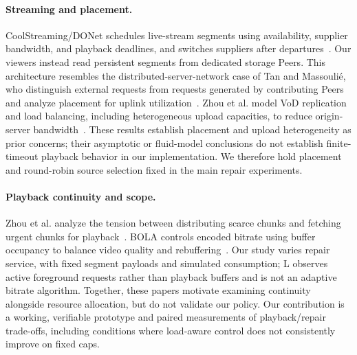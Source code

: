 \paragraph{Streaming and placement.}
CoolStreaming/DONet schedules live-stream segments using availability,
supplier bandwidth, and playback deadlines, and switches suppliers after
departures~\cite{zhang2005coolstreaming}. Our viewers instead read persistent
segments from dedicated storage Peers. This architecture resembles the
distributed-server-network case of Tan and Massouli\'{e}, who distinguish
external requests from requests generated by contributing Peers and analyze
placement for uplink utilization~\cite{tan2011placement}. Zhou et al. model
VoD replication and load balancing, including heterogeneous upload
capacities, to reduce origin-server bandwidth~\cite{zhou2011replication}.
These results establish placement and upload heterogeneity as prior concerns;
their asymptotic or fluid-model conclusions do not establish finite-timeout
playback behavior in our implementation. We therefore hold placement and
round-robin source selection fixed in the main repair experiments.

\paragraph{Playback continuity and scope.}
Zhou et al. analyze the tension between distributing scarce chunks and
fetching urgent chunks for playback~\cite{zhou2011chunks}. BOLA controls
encoded bitrate using buffer occupancy to balance video quality and
rebuffering~\cite{spiteri2016bola}. Our study varies repair service, with
fixed segment payloads and simulated consumption; L observes active
foreground requests rather than playback buffers and is not an adaptive
bitrate algorithm. Together, these papers motivate examining continuity
alongside resource allocation, but do not validate our policy. Our
contribution is a working, verifiable prototype and paired measurements of
playback/repair trade-offs, including conditions where load-aware control
does not consistently improve on fixed caps.
